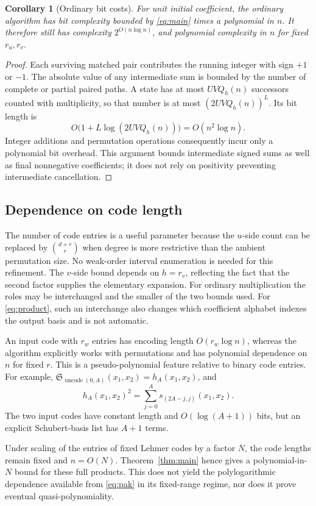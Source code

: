 \documentclass{amsart}
\newtheorem{corollary}[theorem]{Corollary}
\theoremstyle{definition}
\theoremstyle{remark}
\numberwithin{equation}{section}
\newcommand{\Sch}{\mathfrak S}
\begin{document}
\begin{corollary}[Ordinary bit costs]\label{cor:bits}
For unit initial coefficient, the ordinary algorithm has
bit complexity bounded by \eqref{eq:main} times a polynomial in $n$.
It therefore still has complexity $2^{O(n\log n)}$, and polynomial
complexity in $n$ for fixed $r_u,r_v$.
\end{corollary}
\begin{proof}
Each surviving matched pair contributes the running integer with
sign $+1$ or $-1$.
The absolute value of any intermediate sum is bounded by the number
of complete or partial paired paths.
A state has at most $UVQ_h(n)$ successors counted with multiplicity,
so that number is at most $(2UVQ_h(n))^L$.
Its bit length is
\[
 O\bigl(1+L\log(2UVQ_h(n))\bigr)=O(n^2\log n).
 \]
Integer additions and permutation operations consequently incur only
a polynomial bit overhead.
This argument bounds intermediate signed sums as well as final
nonnegative coefficients; it does not rely on positivity preventing
intermediate cancellation.
\end{proof}

\subsection{Dependence on code length}

The number of code entries is a useful parameter because the
$u$-side count can be replaced by $\binom{d+r}{r}$ when degree
is more restrictive than the ambient permutation size.
No weak-order interval enumeration is needed for this refinement.
The $v$-side bound depends on $h=r_v$, reflecting the fact that the
second factor supplies the elementary expansion.
For ordinary multiplication the roles may be interchanged and the
smaller of the two bounds used.
For \eqref{eq:product}, such an interchange also changes which
coefficient alphabet indexes the output basis and is not automatic.

An input code with $r_w$ entries has encoding length
$O(r_w\log n)$, whereas the algorithm explicitly works with
permutations and has polynomial dependence on $n$ for fixed $r$.
This is a pseudo-polynomial feature relative to binary code entries.
For example, $\Sch_{\operatorname{uncode}(0,A)}(x_1,x_2)=h_A(x_1,x_2)$,
and
\[
 h_A(x_1,x_2)^2
   =\sum_{j=0}^{A}s_{(2A-j,j)}(x_1,x_2).
\]
The two input codes have constant length and $O(\log(A+1))$ bits,
but an explicit Schubert-basis list has $A+1$ terms.

Under scaling of the entries of fixed Lehmer codes by a factor $N$,
the code lengths remain fixed and $n=O(N)$.
Theorem~\ref{thm:main} hence gives a polynomial-in-$N$ bound for these
full products.
This does not yield the polylogarithmic dependence available from
\eqref{eq:pak} in its fixed-range regime, nor does it prove eventual
quasi-polynomiality.
\end{document}
